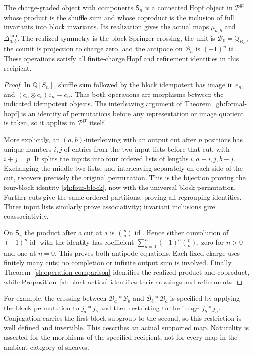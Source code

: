 \begin{theorem}\label{sh:hopf}
The charge-graded object with components $\mathsf S_n$ is a
connected Hopf object in $\mathcal P^{\mathrm{gr}}$ whose
product is the shuffle sum and whose coproduct is the inclusion
of full invariants into block invariants. Its realization gives
the actual maps $\mu_{a,b}$ and
$\Delta^{\mathrm{sup}}_{a,b}$.
The realized symmetry is the block Springer crossing, the unit
is $\mathcal B_0=\mathbb Q_{B_E}$, the counit is projection to
charge zero, and the antipode on $\mathcal B_n$ is
$(-1)^n\operatorname{id}$.
These operations satisfy all finite-charge Hopf and refinement
identities in this recipient.
\end{theorem}
\begin{proof}
In $\mathbb Q[S_n]$, shuffle sum followed by the block
idempotent has image in $e_n$, and
$(e_a\otimes e_b)e_n=e_n$. Thus both operations are morphisms
between the indicated idempotent objects. The interleaving
argument of Theorem~\ref{gh:formal-hopf} is an identity of
permutations before any representation or image quotient is
taken, so it applies in $\mathcal P^{\mathrm{gr}}$ itself.

More explicitly, an $(a,b)$-interleaving with an output cut after
$p$ positions has unique numbers $i,j$ of entries from the two
input lists before that cut, with $i+j=p$. It splits the inputs
into four ordered lists of lengths $i,a-i,j,b-j$. Exchanging
the middle two lists, and interleaving separately on each side
of the cut, recovers precisely the original permutation.
This is the bijection proving the four-block identity
\eqref{gh:four-block}, now with the universal block permutation.
Further cuts give the same ordered partitions, proving all
regrouping identities. Three input lists similarly prove
associativity; invariant inclusions give coassociativity.

On $\mathsf S_n$ the product after a cut at $a$ is
$\binom na\operatorname{id}$. Hence either convolution of
$(-1)^n\operatorname{id}$ with the identity has coefficient
$\sum_{a=0}^n(-1)^a\binom na$, zero for $n>0$ and one at
$n=0$. This proves both antipode equations. Each fixed charge
uses finitely many cuts; no completion or infinite output sum
is involved. Finally Theorem~\ref{sh:operation-comparison}
identifies the realized product and coproduct, while
Proposition~\ref{sh:block-action} identifies their crossings
and refinements.
\end{proof}

For example, the crossing between
$\mathcal B_a*\mathcal B_b$ and
$\mathcal B_b*\mathcal B_a$ is specified by applying the block
permutation to $j_a*j_b$ and then restricting to the image
$j_b*j_a$. Conjugation carries the first block subgroup to the
second, so this restriction is well defined and invertible.
This describes an actual supported map. Naturality is asserted
for the morphisms of the specified recipient, not for every
map in the ambient category of sheaves.

